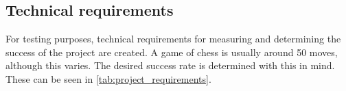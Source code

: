 \subsection{Technical requirements}
For testing purposes, technical requirements for measuring and determining the success of the project are created. A game of chess is usually around 50 moves, although this varies. The desired success rate is determined with this in mind.
These can be seen in \cref{tab:project_requirements}.






